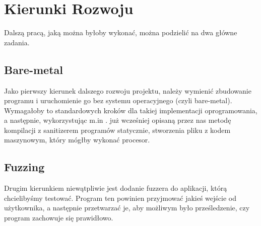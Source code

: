 \documentclass[../main.tex]{subfiles}
\begin{document}
		
	\section{Kierunki Rozwoju}
Dalszą pracą, jaką można byłoby wykonać, można podzielić na dwa główne zadania.

		\subsection{Bare-metal}
 Jako pierwszy kierunek dalszego rozwoju projektu, należy wymienić zbudowanie programu i uruchomienie go bez systemu operacyjnego (czyli bare-metal). Wymagałoby to standardowych kroków dla takiej implementacji oprogramowania, a następnie, wykorzystując m.in . już wcześniej opisaną przez nas metodę kompilacji z sanitizerem programów statycznie, stworzenia pliku z kodem maszynowym, który mógłby wykonać procesor.



		\subsection{Fuzzing}
		Drugim kierunkiem niewątpliwie jest dodanie fuzzera do aplikacji, którą chcielibyśmy testować. Program ten powinien przyjmować jakieś wejście od użytkownika, a następnie przetwarzać je, aby możliwym było prześledzenie, czy program zachowuje się prawidłowo.
\end{document}
